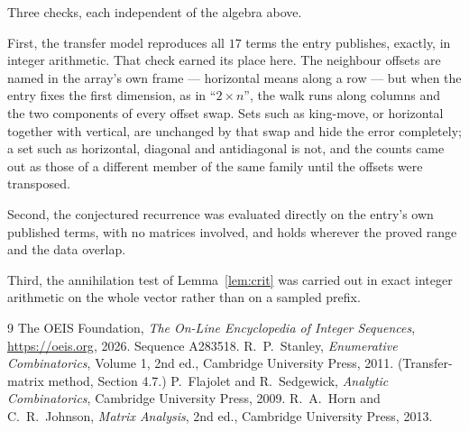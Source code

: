 \documentclass[11pt,a4paper]{article}
\theoremstyle{plain}
\theoremstyle{definition}
\begin{document}
Three checks, each independent of the algebra above.

First, the transfer model reproduces all $17$ terms the entry publishes, exactly, in
integer arithmetic. That check earned its place here. The neighbour offsets are named in the
array's own frame --- horizontal means along a row --- but when the entry fixes the first
dimension, as in ``$2\times n$'', the walk runs along columns and the two components of every
offset swap. Sets such as king-move, or horizontal together with vertical, are unchanged by
that swap and hide the error completely; a set such as horizontal, diagonal and antidiagonal
is not, and the counts came out as those of a different member of the same family until the
offsets were transposed.

Second, the conjectured recurrence was evaluated directly on the entry's own published terms,
with no matrices involved, and holds wherever the proved range and the data overlap.

Third, the annihilation test of Lemma~\ref{lem:crit} was carried out in exact integer
arithmetic on the whole vector rather than on a sampled prefix.

\begin{thebibliography}{9}
 The OEIS Foundation, \emph{The On-Line Encyclopedia of Integer
Sequences}, \url{https://oeis.org}, 2026. Sequence A283518.
 R.~P.~Stanley, \emph{Enumerative Combinatorics}, Volume 1, 2nd ed.,
Cambridge University Press, 2011. (Transfer-matrix method, Section 4.7.)
 P.~Flajolet and R.~Sedgewick, \emph{Analytic Combinatorics}, Cambridge
University Press, 2009.
 R.~A.~Horn and C.~R.~Johnson, \emph{Matrix Analysis}, 2nd ed., Cambridge
University Press, 2013.
\end{thebibliography}
\end{document}
